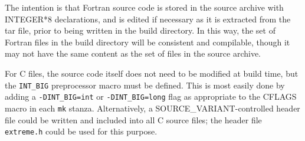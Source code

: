 \documentclass[twoside,11pt,nolof]{starlink}
\providecommand{\file}[1]{\texttt{#1}}
\providecommand{\cc}[1]{\texttt{#1}}
\begin{document}
The intention is that Fortran source code is stored in the source
archive with INTEGER*8 declarations,
and is edited if necessary
as it is extracted from the tar file, prior to being
written in the build directory.
In this way, the set of Fortran files in the build directory
will be consistent and compilable,
though it
may not have the same content as the set of files in the source archive.

For C files, the source code itself does not need to be modified at
build time, but the \cc{INT\_BIG} preprocessor macro must be defined.
This is most easily done by adding a \cc{-DINT\_BIG=int} or
\cc{-DINT\_BIG=long} flag as appropriate to the
CFLAGS macro in each \file{mk} stanza.
Alternatively, a SOURCE\_VARIANT-controlled header file could be
written and included into all C source files;
the header file \file{extreme.h} could be used
for this purpose.
\end{document}
